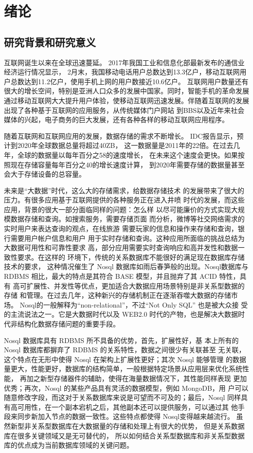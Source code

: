 
\chapter{绪论}
\section{研究背景和研究意义}
互联网诞生以来在全球迅速蔓延。
2017年我国工业和信息化部最新发布的通信业经济运行情况显示，
2月末，我国移动电话用户总数达到13.3亿户，移动互联网用户总数达到11.2亿户，使用手机上网的用户数接近10.6亿户。
互联网用户数量还有很大的增长空间，特别是亚洲人口众多的发展中国家。同时，智能手机的革命发展
通过移动互联网大大提升用户体验，使移动互联网迅速发展。伴随着互联网的发展
出现了各种基于互联网的应用服务，从传统媒体门户网站
到BBS以及近年来社会媒体的兴起，电子商务的巨大发展，还有各种各样的移动互联网应用程序。

随着互联网和互联网应用的发展，数据存储的需求不断增长。
IDC报告显示，预计到2020年全球数据总量将超过40ZB，
这一数据量是2011年的22倍。在过去几年，全球的数据量以每年百分之58的速度增长，
在未来这个速度会更快。如果按照现在存储容量每年百分之40的增长速度计算，
到2020年需要存储的数据量甚至会大于存储设备的总容量。

未来是“大数据”时代，这么大的存储需求，给数据存储技术
的发展带来了很大的压力。有很多应用基于互联网提供的各种服务正在进入井喷
时代的发展，而这些应用，背景的很大一部分面临同样的问题：怎么样
以尽可能廉价的方式实现大规模数据存储和查询。如搜索服务，需要存储页面
而分析，微博等社交网络需求的实时用户来表达查询的观点，在线旅游
需要玩家的信息和操作来存储和查询，银行需要用户帐户信息和用户
用于实时存储和查询。这种应用所面临的挑战总结为大数据可用性和可靠性要求
高，部分应用需要实时查询响应和高并发性和数据一致性要求。在这样的
环境下，传统的关系数据库不能很好的满足现在数据库存储技术的要求，
这种情况催生了 Nosql 数据库如雨后春笋般的出现。Nosql数据库与
RDBMS 相比，最大的特点是其符合 BASE 模型，并且抛弃了其 ACID 特性，具有
高可扩展性、并发性等优点，更加适合大数据应用场景特别是非关系型数据的存储
和管理。在过去几年，这种新兴的存储机制正在逐渐吞噬大数据的存储市场。
Nosql的一般解释为“non-relational”，不过“Not Only SQL” 也是被大众接
受的主流说法之一。它是大数据时代以及 WEB2.0 时代的产物，也是解决大数据时
代非结构化数据存储问题的重要手段。

Nosql 数据库具有 RDBMS 所不具备的优势，首先，扩展性好，基
本上所有的 Nosql 数据库都摒弃了 RDBMS 的关系特性，数据之间很少有关联甚至
无关联，这个特点在无形中使得 Nosql 在架构上扩展性更好；其次 Nosql 能够管理
的数据量更大，性能更好，数据库的结构简单，一般根据特定场景从应用层来优化系统性能，
再加之新型存储器件的辅助，使得在海量数据情况下，其性能同样表现
更加优秀；再次，Nosql 的某些产品具有灵活的数据模型，例如 MongoDB，用
户可以随意修改字段，而这对于关系数据库来说是可望而不可及的；最后，Nosql
同样具有高可用性，在一个副本宕机之后，其他副本还可以提供服务，可以通过其
他手段来同步新加入节点的数据一致性。这些特点都使得 Nosql变得越来越流行。
虽然新型非关系型数据库在大数据量的存储和处理上有很大的优势，
但是关系数据库在很多关键领域又是无可替代的，
所以如何结合关系型数据库和非关系型数据库的优点成为当前数据库领域的关键问题。

